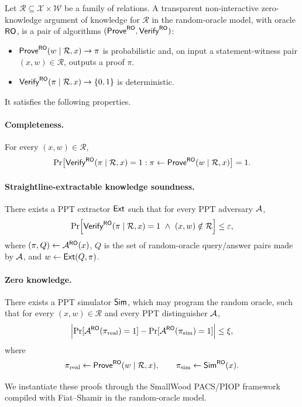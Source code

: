 \begin{definition}\label{def:nizk-ark}
Let \(\mathcal R\subseteq \mathcal X\times \mathcal W\) be a family of relations.  A transparent non-interactive
zero-knowledge argument of knowledge for \(\mathcal R\) in the random-oracle model, with oracle \(\mathsf{RO}\), is a
pair of algorithms \((\mathsf{Prove}^{\mathsf{RO}},\mathsf{Verify}^{\mathsf{RO}})\):
\begin{itemize}[leftmargin=1.25em]
  \item \(\mathsf{Prove}^{\mathsf{RO}}(w\mid \mathcal R,x)\to \pi\) is probabilistic and, on input a statement-witness pair
  \((x,w)\in\mathcal R\), outputs a proof \(\pi\).
  \item \(\mathsf{Verify}^{\mathsf{RO}}(\pi\mid \mathcal R,x)\to\{0,1\}\) is deterministic.
\end{itemize}
It satisfies the following properties.

\paragraph{Completeness.}
For every \((x,w)\in\mathcal R\),
\[
  \Pr\bigl[\mathsf{Verify}^{\mathsf{RO}}(\pi\mid \mathcal R,x)=1 :
  \pi\gets\mathsf{Prove}^{\mathsf{RO}}(w\mid \mathcal R,x)\bigr]=1.
\]

\paragraph{Straightline-extractable knowledge soundness.}
There exists a PPT extractor \(\mathsf{Ext}\) such that for every PPT adversary \(\mathcal{A}\),
\[
  \Pr\Bigl[
    \mathsf{Verify}^{\mathsf{RO}}(\pi\mid \mathcal R,x)=1\ \wedge\ (x,w)\notin \mathcal R
  \Bigr]\le \varepsilon,
\]
where \((\pi,Q)\leftarrow \mathcal{A}^{\mathsf{RO}}(x)\), \(Q\) is the set of random-oracle query/answer pairs made by
\(\mathcal{A}\), and \(w\leftarrow\mathsf{Ext}(Q,\pi)\).

\paragraph{Zero knowledge.}
There exists a PPT simulator \(\mathsf{Sim}\), which may program the random oracle, such that for every
\((x,w)\in\mathcal R\) and every PPT distinguisher \(\mathcal{A}\),
\[
  \Bigl|\Pr[\mathcal{A}^{\mathsf{RO}}(\pi_{\mathrm{real}})=1]
  -\Pr[\mathcal{A}^{\mathsf{RO}}(\pi_{\mathrm{sim}})=1]\Bigr|\le \xi,
\]
where
\[
  \pi_{\mathrm{real}}\gets \mathsf{Prove}^{\mathsf{RO}}(w\mid \mathcal R,x),
  \qquad
  \pi_{\mathrm{sim}}\gets \mathsf{Sim}^{\mathsf{RO}}(x).
\]
\end{definition}

We instantiate these proofs through the SmallWood PACS/PIOP framework compiled with Fiat--Shamir in the
random-oracle model.

